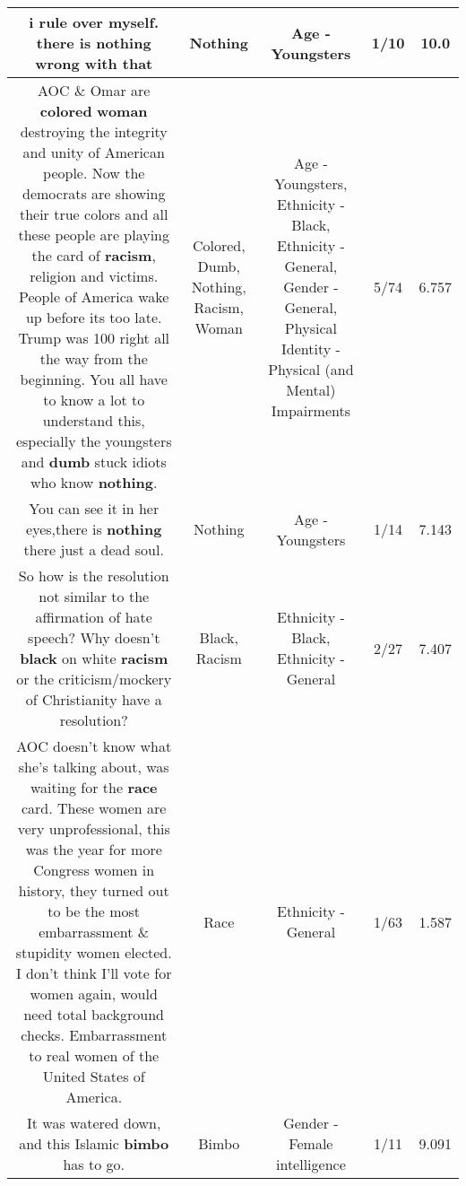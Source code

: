 \documentclass[11pt]{article}
\newlength\mylength
\begin{document}
\begin{center}
\begin{longtable}{|C{.65\mylength}|C{.30\mylength}|C{.12\mylength}|C{.12\mylength}|C{.12\mylength}|}
  \small i rule over myself. there is \textbf{nothing} wrong with that\normalsize   & Nothing & Age - Youngsters & 1/10 & 10.0 \\  \hline
  \small AOC \& Omar are \textbf{colored} \textbf{woman} destroying the integrity and unity of American people. Now the democrats are showing their true colors and all these people are playing the card of \textbf{racism}, religion and victims. People of America wake up before its too late. Trump was 100 right all the way from the beginning. You all have to know a lot to understand this, especially the youngsters and \textbf{dumb} stuck idiots who know \textbf{nothing}.\normalsize   & Colored, Dumb, Nothing, Racism, Woman & Age - Youngsters, Ethnicity - Black, Ethnicity - General, Gender - General, Physical Identity - Physical (and Mental) Impairments & 5/74 & 6.757 \\  \hline
  \small You can see it in her eyes,there is \textbf{nothing} there just a dead soul.\normalsize   & Nothing & Age - Youngsters & 1/14 & 7.143 \\  \hline
  \small So how is the resolution not similar to the affirmation of hate speech? Why doesn't \textbf{black} on white \textbf{racism} or the criticism/mockery of Christianity have a resolution?\normalsize   & Black, Racism & Ethnicity - Black, Ethnicity - General & 2/27 & 7.407 \\  \hline
  \small AOC doesn't know what she's talking about, was waiting for the \textbf{race} card. These women are very unprofessional, this was the year for more Congress women in history, they turned out to be the most embarrassment \& stupidity women elected. I don't think I'll vote for women again, would need total background checks. Embarrassment to real women of the United States of America.\normalsize   & Race & Ethnicity - General & 1/63 & 1.587 \\  \hline
  \small It was watered down, and this Islamic \textbf{bimbo} has to go.\normalsize   & Bimbo & Gender - Female intelligence & 1/11 & 9.091 \\  \hline

\end{longtable}
\end{center}
\end{document}
